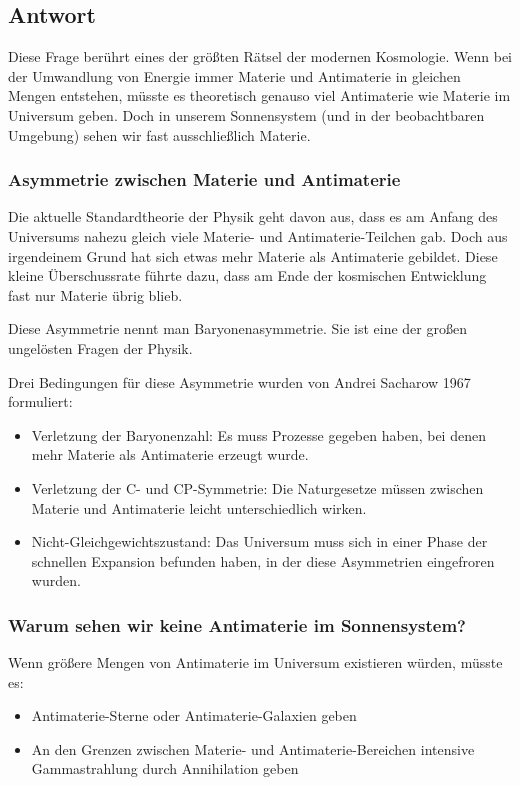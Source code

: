 \documentclass{article}
\begin{document}
	\subsection{Antwort}
	Diese Frage berührt eines der größten Rätsel der modernen Kosmologie. Wenn bei der Umwandlung von Energie immer Materie und Antimaterie in gleichen Mengen entstehen, müsste es theoretisch genauso viel Antimaterie wie Materie im Universum geben. Doch in unserem Sonnensystem (und in der beobachtbaren Umgebung) sehen wir fast ausschließlich Materie.
	
	\subsubsection{Asymmetrie zwischen Materie und Antimaterie}
	Die aktuelle Standardtheorie der Physik geht davon aus, dass es am Anfang des Universums nahezu gleich viele Materie- und Antimaterie-Teilchen gab. Doch aus irgendeinem Grund hat sich etwas mehr Materie als Antimaterie gebildet. Diese kleine Überschussrate führte dazu, dass am Ende der kosmischen Entwicklung fast nur Materie übrig blieb.
	
	Diese Asymmetrie nennt man Baryonenasymmetrie. Sie ist eine der großen ungelösten Fragen der Physik.
	
	Drei Bedingungen für diese Asymmetrie wurden von Andrei Sacharow 1967 formuliert:
	\begin{itemize}
		\item Verletzung der Baryonenzahl: Es muss Prozesse gegeben haben, bei denen mehr Materie als Antimaterie erzeugt wurde.
		\item Verletzung der C- und CP-Symmetrie: Die Naturgesetze müssen zwischen Materie und Antimaterie leicht unterschiedlich wirken.
		\item Nicht-Gleichgewichtszustand: Das Universum muss sich in einer Phase der schnellen Expansion befunden haben, in der diese Asymmetrien eingefroren wurden.
	\end{itemize}
	
	\subsubsection{Warum sehen wir keine Antimaterie im Sonnensystem?}
	Wenn größere Mengen von Antimaterie im Universum existieren würden, müsste es:
	\begin{itemize}
		\item Antimaterie-Sterne oder Antimaterie-Galaxien geben
		\item An den Grenzen zwischen Materie- und Antimaterie-Bereichen intensive Gammastrahlung durch Annihilation geben
	\end{itemize}
	
\end{document}

